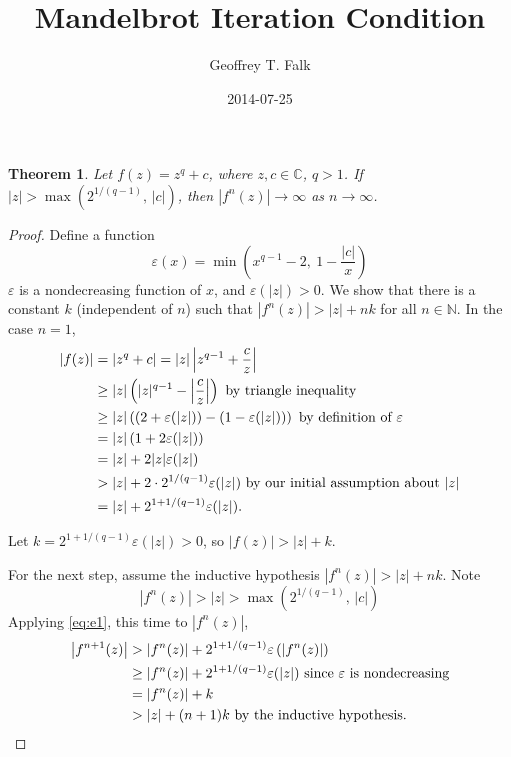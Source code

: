 \documentclass[11pt]{article}
\date{2014-07-25}
\author{Geoffrey T. Falk}
\title{Mandelbrot Iteration Condition}
\begin{document}

\maketitle

\newtheorem*{theorem}{Theorem}

\begin{theorem}
Let \( f(z) = z^q + c \), where \( z, c \in \mathbb{C} \), \( q > 1 \).
If \( |z| > \max\left(2^{1/(q-1)},\, |c|\right) \), then
\( |f^n(z)| \rightarrow \infty \) as \( n \rightarrow \infty \).
\end{theorem}

\begin{proof}
Define a function
\[
\varepsilon(x) = \min\left(x^{q-1} - 2,\ 1 - \frac{|c|}{x}\right)
\]
\( \varepsilon \) is a nondecreasing function of \( x \), and \( \varepsilon(|z|) > 0 \).
We show that there is a constant \( k \) (independent of \( n \)) such that
\( |f^n(z)| > |z| + n k \) for all \( n \in \mathbb{N} \). In the case \( n = 1 \),
\begin{equation} \label{eq:e1}
\begin{aligned}
|f(z)| &= \left| z^q + c \right| = |z| \left| z^{q-1} + \frac{c}{z} \right| \\
&\geq |z| \left( |z|^{q-1} - {\left|\frac{c}{z}\right|} \right) \text{ by triangle inequality} \\
&\geq |z| \left( \left(2 + \varepsilon(|z|) \right) - \left(1 - \varepsilon(|z|)\right) \right)
 \text{ by definition of \( \varepsilon \)} \\
&= |z| \left(1 + 2 \varepsilon(|z|) \right) \\
&= |z| + 2 |z| \varepsilon(|z|) \\
&> |z| + 2 \cdot 2^{{1/(q-1)}} \varepsilon(|z|) \text{ by our initial assumption about } |z| \\
&= |z| + 2^{1 + {1/(q-1)}} \varepsilon(|z|).
\end{aligned}
\end{equation}

Let \( k = 2^{1 + {1/(q-1)}} \varepsilon(|z|) > 0 \), so \( |f(z)| > |z| + k \).

For the next step, assume the inductive hypothesis \( |f^n(z)| > |z| + n k \).
Note
\[
|f^n(z)| > |z| > \max\left(2^{1/(q-1)},\, |c|\right)
\]
Applying \eqref{eq:e1}, this time to \( |f^n(z)| \),
\begin{equation} \label{eq:e2}
\begin{aligned}
\left|f^{n+1}(z)\right| 
&> \left|f^n(z)\right| +  2^{1 + {1/(q-1)}} \varepsilon\left( \left|f^n(z)\right| \right) \\
&\geq \left|f^n(z)\right| + 2^{1 + {1/(q-1)}} \varepsilon(|z|) \text{ since \( \varepsilon \) is nondecreasing} \\
&= \left|f^n(z)\right| + k \\
&> |z| + (n+1)k \text{ by the inductive hypothesis.}
\end{aligned}
\end{equation}
\end{proof}
\end{document}
